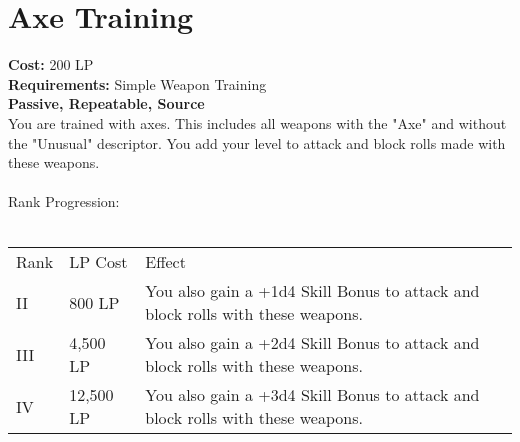 \section{Axe Training}\label{perk:axeTraining}
\textbf{Cost:} 200 LP\\
\textbf{Requirements:} Simple Weapon Training\\
\textbf{Passive, Repeatable, Source}\\
You are trained with axes.
This includes all weapons with the "Axe" and without the "Unusual" descriptor.
You add your level to attack and block rolls made with these weapons.\\
\\
Rank Progression:\\
\\
\begin{longtable}{l | l | p{9cm}}
	Rank & LP Cost & Effect\\
	II & 800 LP & You also gain a +1d4 Skill Bonus to attack and block rolls with these weapons.\\
	III & 4,500 LP & You also gain a +2d4 Skill Bonus to attack and block rolls with these weapons.\\
	IV & 12,500 LP & You also gain a +3d4 Skill Bonus to attack and block rolls with these weapons.\\
\end{longtable}